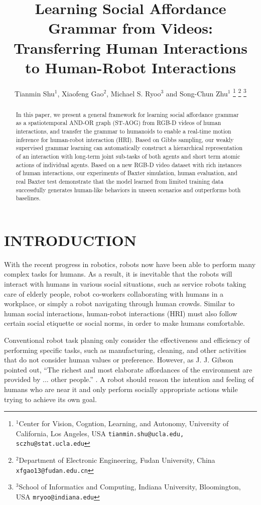 \documentclass[letterpaper, 10 pt, conference]{ieeeconf}  %
\title{\LARGE \bf
 Learning Social Affordance Grammar from Videos:\\Transferring Human Interactions to Human-Robot Interactions
}
\author{Tianmin Shu$^{1}$, Xiaofeng Gao$^{2}$, Michael S. Ryoo$^{3}$ and Song-Chun Zhu$^{1}$%
\thanks{$^{1}$Center for Vision, Cogntion, Learning, and Autonomy, University of California, Los Angeles, USA
        {\tt\small tianmin.shu@ucla.edu, sczhu@stat.ucla.edu}}%
\thanks{$^{2}$Department of Electronic Engineering, Fudan University, China
        {\tt\small xfgao13@fudan.edu.cn}}%
\thanks{$^{3}$School of Informatics and Computing, Indiana University, Bloomington, USA
        {\tt\small mryoo@indiana.edu}}
}
\begin{document}
\maketitle
\thispagestyle{empty}
\pagestyle{empty}


\begin{abstract}

In this paper, we present a general framework for learning social affordance grammar as a spatiotemporal AND-OR graph (ST-AOG) from RGB-D videos of human interactions, and transfer the grammar to humanoids to enable a real-time motion inference for human-robot interaction (HRI). Based on Gibbs sampling, our weakly supervised grammar learning can automatically construct a hierarchical representation of an interaction with long-term joint sub-tasks of both agents and short term atomic actions of individual agents. Based on a new RGB-D video dataset with rich instances of human interactions, our experiments of Baxter simulation, human evaluation, and real Baxter test demonstrate that the model learned from limited training data successfully generates human-like behaviors in unseen scenarios and outperforms both baselines.

\end{abstract}




\section{INTRODUCTION}


With the recent progress in robotics, robots now have been able to perform many complex tasks for humans. As a result, it is inevitable that the robots will interact with humans in various social situations, such as service robots taking care of elderly people, robot co-workers collaborating with humans in a workplace, or simply a robot navigating through human crowds. Similar to human social interactions, human-robot interactions (HRI) must also follow certain social etiquette or social norms, in order to make humans comfortable.

Conventional robot task planing only consider the effectiveness and efficiency of performing specific tasks, such as manufacturing, cleaning, and other activities that do not consider human values or preference. However, as J. J. Gibson pointed out, ``The richest and most elaborate affordances of the environment are provided by ... other people.'' \cite{Gibson}. A robot should reason the intention and feeling of humans who are near it and only perform socially appropriate actions while trying to achieve its own goal.
\end{document}
